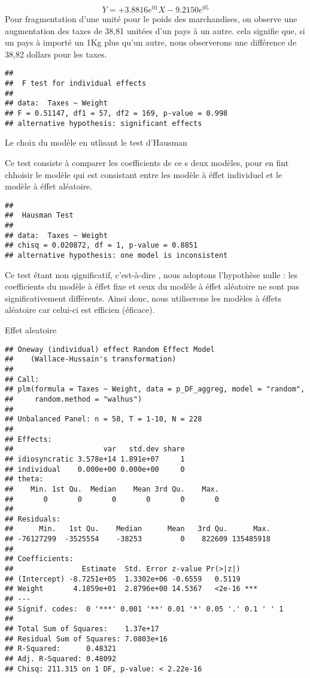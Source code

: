 \documentclass[
]{book}
\begin{document}
\[ Y = + 3.8816e^{01}X - 9.2150e^{05} \]
Pour fragmentation d'une unité pour le poids des marchandises, on observe une augmentation des taxes de 38,81 unitées d'un pays à un autre. cela signifie que, si un pays à importé un 1Kg plus qu'un autre, nous observerons une différence de 38,82 dollars pour les taxes.

\begin{verbatim}
## 
##  F test for individual effects
## 
## data:  Taxes ~ Weight
## F = 0.51147, df1 = 57, df2 = 169, p-value = 0.998
## alternative hypothesis: significant effects
\end{verbatim}

Le choix du modèle en utlisant le test d'Hausman

Ce test consiste à comparer les coefficients de ce s deux modèles, pour en fint chhoisir le modèle qui est consistant entre les modèle à éffet individuel et le modèle à éffet aléatoire.

\begin{verbatim}
## 
##  Hausman Test
## 
## data:  Taxes ~ Weight
## chisq = 0.020872, df = 1, p-value = 0.8851
## alternative hypothesis: one model is inconsistent
\end{verbatim}

Ce test étant non qignificatif, c'est-à-dire , nous adoptons l'hypothèse nulle : les coefficients du modèle à éffet fixe et ceux du modèle à éffet aléatoire ne sont pas significativement différents. Ainsi donc, nous utiliserons les modèles à éffets aléatoire car celui-ci est efficien (éficace).

Effet aleatoire

\begin{verbatim}
## Oneway (individual) effect Random Effect Model 
##    (Wallace-Hussain's transformation)
## 
## Call:
## plm(formula = Taxes ~ Weight, data = p_DF_aggreg, model = "random", 
##     random.method = "walhus")
## 
## Unbalanced Panel: n = 58, T = 1-10, N = 228
## 
## Effects:
##                     var   std.dev share
## idiosyncratic 3.578e+14 1.891e+07     1
## individual    0.000e+00 0.000e+00     0
## theta:
##    Min. 1st Qu.  Median    Mean 3rd Qu.    Max. 
##       0       0       0       0       0       0 
## 
## Residuals:
##      Min.   1st Qu.    Median      Mean   3rd Qu.      Max. 
## -76127299  -3525554    -38253         0    822609 135485918 
## 
## Coefficients:
##                Estimate  Std. Error z-value Pr(>|z|)    
## (Intercept) -8.7251e+05  1.3302e+06 -0.6559   0.5119    
## Weight       4.1859e+01  2.8796e+00 14.5367   <2e-16 ***
## ---
## Signif. codes:  0 '***' 0.001 '**' 0.01 '*' 0.05 '.' 0.1 ' ' 1
## 
## Total Sum of Squares:    1.37e+17
## Residual Sum of Squares: 7.0803e+16
## R-Squared:      0.48321
## Adj. R-Squared: 0.48092
## Chisq: 211.315 on 1 DF, p-value: < 2.22e-16
\end{verbatim}
\end{document}
